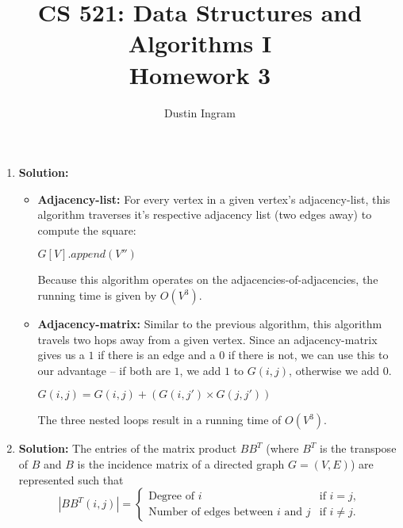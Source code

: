 \documentclass{article}
\title{CS 521: Data Structures and Algorithms I \\ Homework 3}
\author{Dustin Ingram}
\begin{document}
\maketitle
\begin{enumerate}
\item \textbf{Solution:}
\begin{itemize}
    \item \textbf{Adjacency-list:} For every vertex in a given vertex's adjacency-list, this algorithm traverses it's respective adjacency list (two edges away) to compute the square:
    \begin{algorithm}[H]
    \caption{}
    \begin{algorithmic}
    \STATE $G[V].append(V'')$ 
    \ENDIF
    \ENDFOR
    \ENDFOR
    \ENDFOR
    \end{algorithmic} 
    \end{algorithm}
Because this algorithm operates on the adjacencies-of-adjacencies, the running time is given by $O(V^{3})$.
    \item \textbf{Adjacency-matrix:} Similar to the previous algorithm, this algorithm travels two hops away from a given vertex. Since an adjacency-matrix gives us a $1$ if there is an edge and a $0$ if there is not, we can use this to our advantage -- if both are $1$, we add $1$ to $G(i,j)$, otherwise we add $0$.
    \begin{algorithm}[H]
    \caption{}
    \begin{algorithmic}
    \STATE $G(i,j) = G(i,j) + (G(i,j') \times G(j,j'))$
    \ENDIF
    \ENDFOR
    \ENDFOR
    \ENDFOR
    \end{algorithmic} 
    \end{algorithm}
    The three nested loops result in a running time of $O(V^{3})$.
\end{itemize}
\item \textbf{Solution:} 
The entries of the matrix product $BB^{T}$ (where $B^{T}$ is the transpose of $B$ and $B$ is the incidence matrix of a directed graph $G = (V,E)$) are represented such that
\begin{equation*}
|BB^{T}(i,j)|= 
\begin{cases} \text{Degree of $i$} & \text{if $i=j$,}
\\
\text{Number of edges between $i$ and $j$} & \text{if $i\neq j$.}
\end{cases}
\end{equation*}


\end{enumerate}
\end{document}
